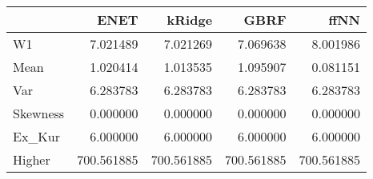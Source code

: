 \begin{tabular}{lrrrr}
\toprule
{} &        ENET &      kRidge &        GBRF &        ffNN \\
\midrule
W1       &    7.021489 &    7.021269 &    7.069638 &    8.001986 \\
Mean     &    1.020414 &    1.013535 &    1.095907 &    0.081151 \\
Var      &    6.283783 &    6.283783 &    6.283783 &    6.283783 \\
Skewness &    0.000000 &    0.000000 &    0.000000 &    0.000000 \\
Ex\_Kur   &    6.000000 &    6.000000 &    6.000000 &    6.000000 \\
Higher   &  700.561885 &  700.561885 &  700.561885 &  700.561885 \\
\bottomrule
\end{tabular}
